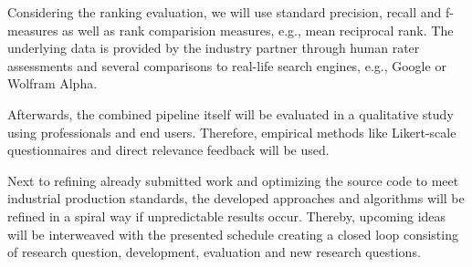 Considering the ranking evaluation, we will use standard precision, recall and f-measures as well as rank comparision measures, e.g., mean reciprocal rank. 
The underlying data is provided by the industry partner through human rater assessments and several comparisons to real-life search engines, e.g., Google or Wolfram Alpha.

Afterwards, the combined pipeline itself will be evaluated in a qualitative study using professionals and end users.
Therefore, empirical methods like Likert-scale questionnaires and direct relevance feedback will be used.


Next to refining already submitted work and optimizing the source code to meet industrial production standards, the developed approaches and algorithms will be refined in a spiral way if unpredictable results occur.
Thereby, upcoming ideas will be interweaved with the presented schedule creating a closed loop consisting of research question, development, evaluation and new research questions.